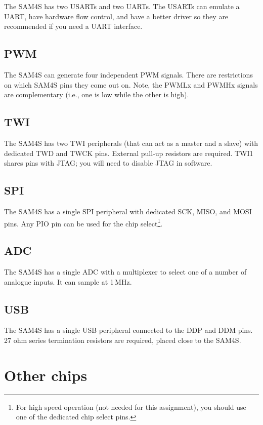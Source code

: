The SAM4S has two USARTs and two UARTs. The USARTs can emulate a
UART, have hardware flow control, and have a better driver so they are
recommended if you need a UART interface.


\subsection{PWM}\label{pwm}

The SAM4S can generate four independent PWM signals. There are
restrictions on which SAM4S pins they come out on. Note, the PWMLx and
PWMHx signals are complementary (i.e., one is low while the other is
high).

\subsection{TWI}\label{twi}

The SAM4S has two TWI peripherals (that can act as a master and
a slave) with dedicated TWD and TWCK pins. External pull-up resistors
are required.  TWI1 shares pins with JTAG; you will need to disable
JTAG in software.

\subsection{SPI}\label{spi}

The SAM4S has a single SPI peripheral with dedicated SCK, MISO, and
MOSI pins. Any PIO pin can be used for the chip select\footnote{For
  high speed operation (not needed for this assignment), you should
  use one of the dedicated chip select pins.}.

\subsection{ADC}\label{adc}

The SAM4S has a single ADC with a multiplexer to select one of a
number of analogue inputs.  It can sample at 1\,MHz.

\subsection{USB}\label{usb}

The SAM4S has a single USB peripheral connected to the DDP and DDM
pins. 27 ohm series termination resistors are required, placed close to
the SAM4S.

\section{Other chips}\label{other-chips}

